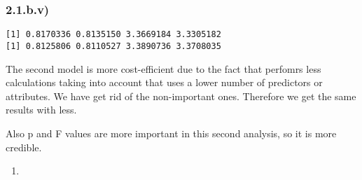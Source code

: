 \documentclass[
]{article}
\newenvironment{Shaded}{\begin{snugshade}}{\end{snugshade}}
\newcommand{\DecValTok}[1]{\textcolor[rgb]{0.00,0.00,0.81}{#1}}
\newcommand{\FunctionTok}[1]{\textcolor[rgb]{0.00,0.00,0.00}{#1}}
\newcommand{\NormalTok}[1]{#1}
\newcommand{\OtherTok}[1]{\textcolor[rgb]{0.56,0.35,0.01}{#1}}
\newcommand{\SpecialCharTok}[1]{\textcolor[rgb]{0.00,0.00,0.00}{#1}}
\providecommand{\tightlist}{%
  \setlength{\itemsep}{0pt}\setlength{\parskip}{0pt}}
\begin{document}
\hypertarget{b.v}{%
\subsubsection{2.1.b.v)}\label{b.v}}

\begin{Shaded}
\end{Shaded}

\begin{verbatim}
[1] 0.8170336 0.8135150 3.3669184 3.3305182
[1] 0.8125806 0.8110527 3.3890736 3.3708035
\end{verbatim}

The second model is more cost-efficient due to the fact that perfomrs
less calculations taking into account that uses a lower number of
predictors or attributes. We have get rid of the non-important ones.
Therefore we get the same results with less.

Also p and F values are more important in this second analysis, so it is
more credible.

\begin{enumerate}
\def\labelenumi{\alph{enumi})}
\setcounter{enumi}{2}
\tightlist
\item
\end{enumerate}
\end{document}
